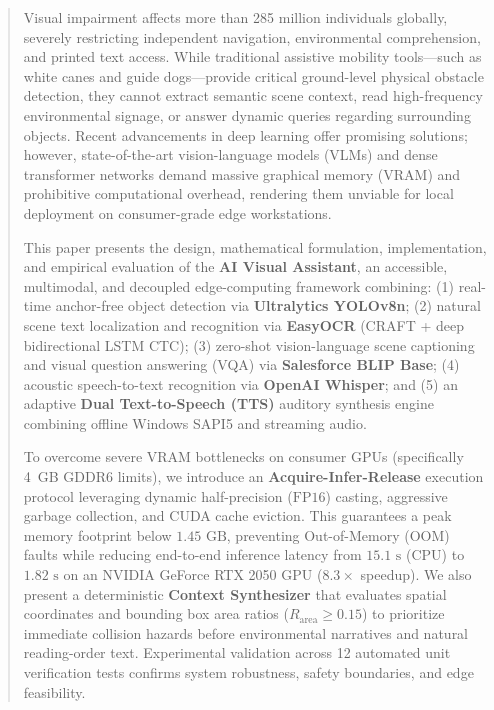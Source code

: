 \documentclass[conference]{IEEEtran}
\begin{document}
\begin{abstract}
Visual impairment affects more than 285 million individuals globally, severely restricting independent navigation, environmental comprehension, and printed text access. While traditional assistive mobility tools---such as white canes and guide dogs---provide critical ground-level physical obstacle detection, they cannot extract semantic scene context, read high-frequency environmental signage, or answer dynamic queries regarding surrounding objects. Recent advancements in deep learning offer promising solutions; however, state-of-the-art vision-language models (VLMs) and dense transformer networks demand massive graphical memory (VRAM) and prohibitive computational overhead, rendering them unviable for local deployment on consumer-grade edge workstations.

This paper presents the design, mathematical formulation, implementation, and empirical evaluation of the \textbf{AI Visual Assistant}, an accessible, multimodal, and decoupled edge-computing framework combining: (1) real-time anchor-free object detection via \textbf{Ultralytics YOLOv8n}; (2) natural scene text localization and recognition via \textbf{EasyOCR} (CRAFT + deep bidirectional LSTM CTC); (3) zero-shot vision-language scene captioning and visual question answering (VQA) via \textbf{Salesforce BLIP Base}; (4) acoustic speech-to-text recognition via \textbf{OpenAI Whisper}; and (5) an adaptive \textbf{Dual Text-to-Speech (TTS)} auditory synthesis engine combining offline Windows SAPI5 and streaming audio.

To overcome severe VRAM bottlenecks on consumer GPUs (specifically 4~GB GDDR6 limits), we introduce an \textbf{Acquire-Infer-Release} execution protocol leveraging dynamic half-precision ($\text{FP16}$) casting, aggressive garbage collection, and CUDA cache eviction. This guarantees a peak memory footprint below $1.45\text{ GB}$, preventing Out-of-Memory ($\text{OOM}$) faults while reducing end-to-end inference latency from $15.1\text{ s}$ (CPU) to $1.82\text{ s}$ on an NVIDIA GeForce RTX 2050 GPU ($8.3\times$ speedup). We also present a deterministic \textbf{Context Synthesizer} that evaluates spatial coordinates and bounding box area ratios ($R_{\text{area}} \ge 0.15$) to prioritize immediate collision hazards before environmental narratives and natural reading-order text. Experimental validation across 12 automated unit verification tests confirms system robustness, safety boundaries, and edge feasibility.
\end{abstract}
\end{document}
